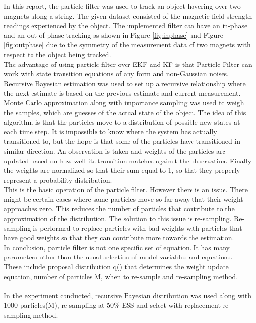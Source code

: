 \documentclass[12pt]{article}
\begin{document}
In this report, the particle filter was used to track an object hovering over two magnets along a string. The given dataset consisted of the magnetic field strength readings experienced by the object. The implemented filter can have an in-phase and an out-of-phase tracking as shown in Figure \ref{fig:inphase} and Figure \ref{fig:outphase} due to the symmetry of the measurement data of two magnets with respect to the object being tracked.\\

The advantage of using particle filter over EKF and KF is that Particle Filter can work with state transition equations of any form and non-Gaussian noises. Recursive Bayesian estimation was used to set up a recursive relationship where the next estimate is based on the previous estimate and current measurement. Monte Carlo approximation along with importance sampling was used to weigh the samples, which are guesses of the actual state of the object. The idea of this algorithm is that the particles move to a distribution of possible new states at each time step. It is impossible to know where the system has actually transitioned to, but the hope is that some of the particles have transitioned in similar direction. An observation is taken and weights of the particles are updated based on how well its transition matches against the observation. Finally the weights are normalized so that their sum equal to 1, so that they properly represent a probability distribution. \\

This is the basic operation of the particle filter. However there is an issue. There might be certain cases where some particles move so far away that their weight approaches zero. This reduces the number of particles that contribute to the approximation of the distribution. The solution to this issue is re-sampling. Re-sampling is performed to replace particles with bad weights with particles that have good weights so that they can contribute more towards the estimation.  \\

In conclusion, particle filter is not one specific set of equation. It has many parameters other than the usual selection of model variables and equations. These include proposal distribution q() that determines the weight update equation, number of particles M, when to re-sample and re-sampling method. \\
\\
In the experiment conducted, recursive Bayesian distribution was used along with 1000 particles(M), re-sampling at 50\% ESS and select with replacement re-sampling method. \\
\\
\end{document}
